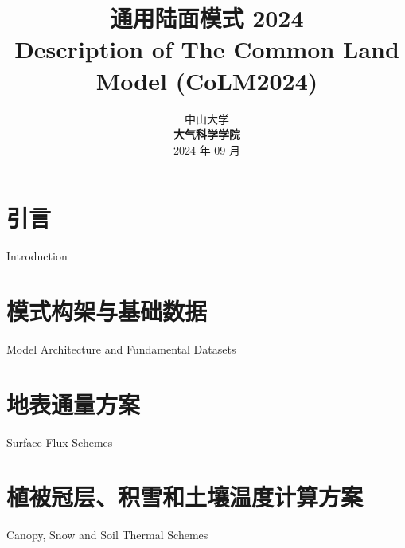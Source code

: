 \documentclass[a4paper,12pt,twoside]{report}
\begin{document}
%

\title{\huge {\bf 通用陆面模式 2024}\\[3em]
  \fontsize {22}{24}
  \bf{ Description of The Common Land Model (CoLM2024)}\\[3in]
  \fontsize {20}{23}%
}

\author{%
  \large{ 中山大学 }\\[0.1in]
  {\bf 大气科学学院}\\[1in]
  \upshape
  \large%
  2024 年 09 月%
}

\maketitle
\preface
%
%
%
%


\body



\part{引言}{Introduction}


\part{模式构架与基础数据}{Model Architecture and Fundamental Datasets}



\part{地表通量方案}{Surface Flux Schemes}\label{part:flux}






\part{植被冠层、积雪和土壤温度计算方案}{Canopy, Snow and Soil Thermal Schemes}\label{part:temp}


\end{document}
